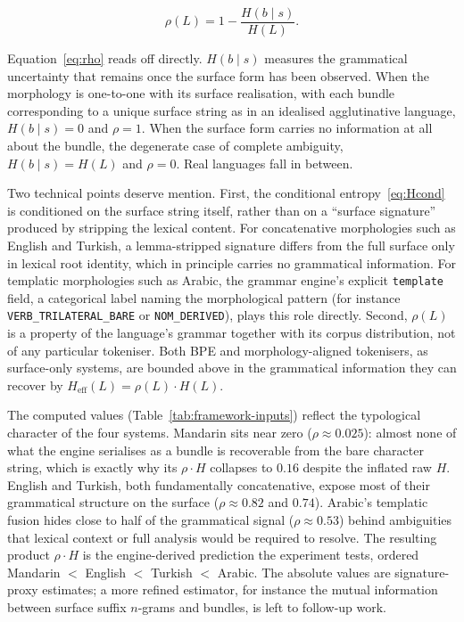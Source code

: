 \begin{equation}
\rho(L) = 1 - \frac{H(b \mid s)}{H(L)}.
\label{eq:rho}
\end{equation}

Equation~\ref{eq:rho} reads off directly. $H(b \mid s)$ measures the grammatical uncertainty that remains once the surface form has been observed. When the morphology is one-to-one with its surface realisation, with each bundle corresponding to a unique surface string as in an idealised agglutinative language, $H(b \mid s) = 0$ and $\rho = 1$. When the surface form carries no information at all about the bundle, the degenerate case of complete ambiguity, $H(b \mid s) = H(L)$ and $\rho = 0$. Real languages fall in between.

Two technical points deserve mention. First, the conditional entropy~\ref{eq:Hcond} is conditioned on the surface string itself, rather than on a ``surface signature'' produced by stripping the lexical content. For concatenative morphologies such as English and Turkish, a lemma-stripped signature differs from the full surface only in lexical root identity, which in principle carries no grammatical information. For templatic morphologies such as Arabic, the grammar engine's explicit \texttt{template} field, a categorical label naming the morphological pattern (for instance \texttt{VERB\_TRILATERAL\_BARE} or \texttt{NOM\_DERIVED}), plays this role directly. Second, $\rho(L)$ is a property of the language's grammar together with its corpus distribution, not of any particular tokeniser. Both BPE and morphology-aligned tokenisers, as surface-only systems, are bounded above in the grammatical information they can recover by $H_{\mathrm{eff}}(L) = \rho(L) \cdot H(L)$.

The computed values (Table~\ref{tab:framework-inputs}) reflect the typological character of the four systems. Mandarin sits near zero ($\rho \approx 0.025$): almost none of what the engine serialises as a bundle is recoverable from the bare character string, which is exactly why its $\rho \cdot H$ collapses to $0.16$ despite the inflated raw $H$. English and Turkish, both fundamentally concatenative, expose most of their grammatical structure on the surface ($\rho \approx 0.82$ and $0.74$). Arabic's templatic fusion hides close to half of the grammatical signal ($\rho \approx 0.53$) behind ambiguities that lexical context or full analysis would be required to resolve. The resulting product $\rho \cdot H$ is the engine-derived prediction the experiment tests, ordered Mandarin $<$ English $<$ Turkish $<$ Arabic. The absolute values are signature-proxy estimates; a more refined estimator, for instance the mutual information between surface suffix $n$-grams and bundles, is left to follow-up work.

